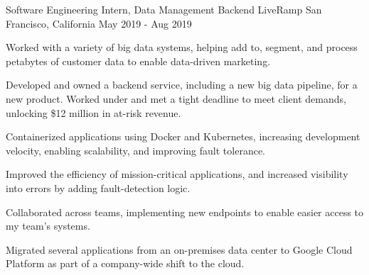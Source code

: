 

\begin{cventries}

    \cventry
      {Software Engineering Intern, Data Management Backend}
      {LiveRamp}
      {San Francisco, California}
      {May 2019 - Aug 2019}
      {
        \begin{cvitems}
          \item Worked with a variety of big data systems, helping add to, segment, and process petabytes of customer data to enable data-driven marketing.
          \item Developed and owned a backend service, including a new big data pipeline, for a new product. Worked under and met a tight deadline to meet client demands, unlocking \$12 million in at-risk revenue.
          \item Containerized applications using Docker and Kubernetes, increasing development velocity, enabling scalability, and improving fault tolerance.         
          \item Improved the efficiency of mission-critical applications, and increased visibility into errors by adding fault-detection logic.
          \item Collaborated across teams, implementing new endpoints to enable easier access to my team's systems.
          \item Migrated several applications from an on-premises data center to Google Cloud Platform as part of a company-wide shift to the cloud.
        \end{cvitems}
      }


\end{cventries}
